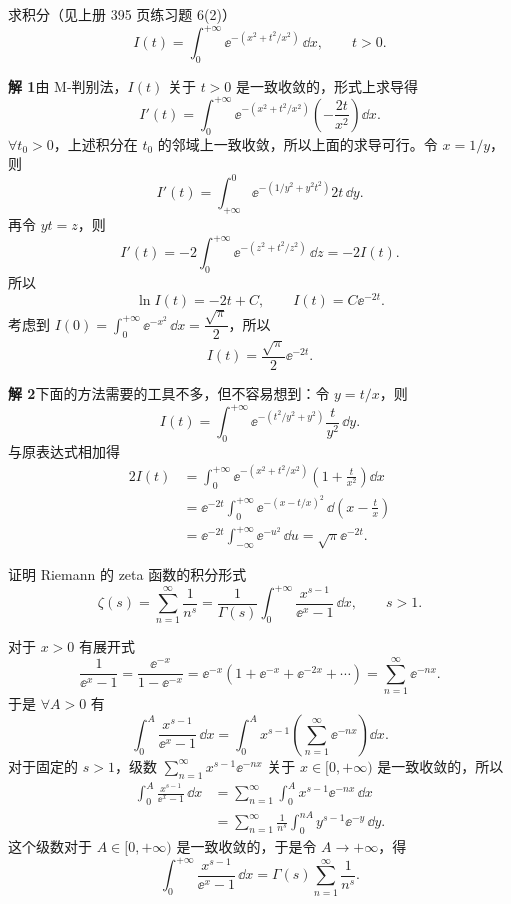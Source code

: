 \begin{xexample}[23.3.3]
求积分（见上册 395 页练习题 6(2)）
\[
  I(t)=\int_0^{+\infty}\ee^{-(x^2+t^2/x^2)}\,\dd x,\qquad t>0.
\]
\end{xexample}
\begin{xsolution}
\textbf{解 1}\quad 由 M-判别法，$I(t)$ 关于 $t>0$ 是一致收敛的，形式上求导得
\[
  I'(t)=\int_0^{+\infty}\ee^{-(x^2+t^2/x^2)}\left(-\frac{2t}{x^2}\right)\dd x.
\]
$\forall t_0>0$，上述积分在 $t_0$ 的邻域上一致收敛，所以上面的求导可行。令 $x=1/y$，则
\[
  I'(t)=\int_{+\infty}^{0}\ee^{-(1/y^2+y^2t^2)}2t\,\dd y.
\]
再令 $yt=z$，则
\[
  I'(t)=-2\int_0^{+\infty}\ee^{-(z^2+t^2/z^2)}\,\dd z=-2I(t).
\]
所以
\[
  \ln I(t)=-2t+C,\qquad I(t)=C\ee^{-2t}.
\]
考虑到 $I(0)=\displaystyle\int_0^{+\infty}\ee^{-x^2}\,\dd x=\dfrac{\sqrt\pi}{2}$，所以
\[
  I(t)=\frac{\sqrt\pi}{2}\ee^{-2t}.
\]

\textbf{解 2}\quad 下面的方法需要的工具不多，但不容易想到：令 $y=t/x$，则
\[
  I(t)=\int_0^{+\infty}\ee^{-(t^2/y^2+y^2)}\frac{t}{y^2}\,\dd y.
\]
与原表达式相加得
\[
\begin{aligned}
  2I(t)&=\int_0^{+\infty}\ee^{-(x^2+t^2/x^2)}\left(1+\frac{t}{x^2}\right)\dd x\\
  &=\ee^{-2t}\int_0^{+\infty}\ee^{-(x-t/x)^2}\,\dd\left(x-\frac tx\right)\\
  &=\ee^{-2t}\int_{-\infty}^{+\infty}\ee^{-u^2}\,\dd u=\sqrt\pi\ee^{-2t}.
\end{aligned}
\]
\end{xsolution}

\begin{xexample}[23.3.4]
证明 Riemann 的 zeta 函数的积分形式
\[
  \zeta(s)=\sum_{n=1}^{\infty}\frac1{n^s}=\frac1{\Gamma(s)}\int_0^{+\infty}\frac{x^{s-1}}{\ee^x-1}\,\dd x,
  \qquad s>1.
\]
\end{xexample}
\begin{xproof}
对于 $x>0$ 有展开式
\[
  \frac1{\ee^x-1}=\frac{\ee^{-x}}{1-\ee^{-x}}=\ee^{-x}(1+\ee^{-x}+\ee^{-2x}+\cdots)=\sum_{n=1}^{\infty}\ee^{-nx}.
\]
于是 $\forall A>0$ 有
\[
  \int_0^A\frac{x^{s-1}}{\ee^x-1}\,\dd x
  =\int_0^A x^{s-1}\left(\sum_{n=1}^{\infty}\ee^{-nx}\right)\dd x.
\]
对于固定的 $s>1$，级数 $\sum_{n=1}^{\infty}x^{s-1}\ee^{-nx}$ 关于 $x\in[0,+\infty)$ 是一致收敛的，所以
\[
\begin{aligned}
  \int_0^A\frac{x^{s-1}}{\ee^x-1}\,\dd x
  &=\sum_{n=1}^{\infty}\int_0^A x^{s-1}\ee^{-nx}\,\dd x\\
  &=\sum_{n=1}^{\infty}\frac1{n^s}\int_0^{nA}y^{s-1}\ee^{-y}\,\dd y.
\end{aligned}
\]
这个级数对于 $A\in[0,+\infty)$ 是一致收敛的，于是令 $A\to+\infty$，得
\[
  \int_0^{+\infty}\frac{x^{s-1}}{\ee^x-1}\,\dd x=\Gamma(s)\sum_{n=1}^{\infty}\frac1{n^s}.
\]
\end{xproof}

